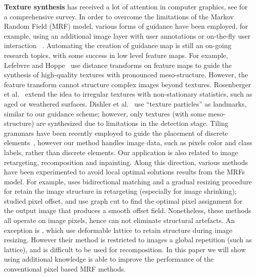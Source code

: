 \documentclass{acmtog}
\begin{document}
\textbf{Texture synthesis} has received a lot of attention in computer graphics, see \cite{Wei2009STAR} for a comprehensive survey. In order to overcome the limitations of the Markov Random Field (MRF) model, various forms of guidance have been employed, for example, using an additional image layer with user annotations \cite{Hertzmann2001IA} or on-the-fly user interaction ~\cite{Barnes2009,Hu2013PPI}. Automating the creation of guidance map is still an on-going research topics, with some success in low level feature maps. For example, Lefebvre and Hoppe~ use distance transforms on feature maps to guide the synthesis of high-quality textures with pronounced meso-structure. However, the feature transform cannot structure complex images beyond textures. 
 Rosenberger et al.~ extend the idea to irregular textures with non-stationary statistics, such as aged or weathered surfaces. Dishler et al.~ use ``texture particles'' as landmarks, similar to our guidance scheme; however, only textures (with some meso-structure) are synthesized due to limitations in the detection stage. Tiling grammars have been recently employed to guide the placement of discrete elements~\cite{Ma2011DET,Ma2013DET}, however our method handles image data, such as pixels color and class labels, rather than discrete elements. Our application is also related to image retargeting, recomposition and inpainting. Along this direction, various methods have been experimented to avoid local optimal solutions results from the MRFs model. For example, \cite{Simakov2008SV} uses bidirectional matching and a gradual resizing procedure for retain the image structure in retargeting (especially for image shrinking); \cite{Pritch09ICCV,He2012PO} studied pixel offset, and use graph cut to find the optimal pixel assignment for the output image that produces a smooth offset field. Nonetheless, these methods all operate on image pixels, hence can not eliminate structural artefacts. An exception is \cite{Wu2010SS}, which use deformable lattice to retain structure during image resizing. However their method is restricted to images  a global repetition (such as lattice), and is difficult to be used for recomposition. In this paper we will show using additional  knowledge is able to improve the performance of the conventional pixel based MRF methods. 
\end{document}
